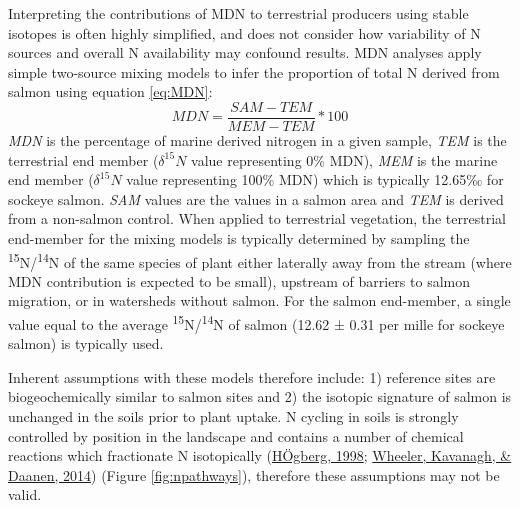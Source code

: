 \documentclass [11pt, proquest] {uwthesis}[2015/03/03]
\begin{document}
Interpreting the contributions of MDN to terrestrial producers using stable isotopes is often highly simplified, and does not consider how variability of N sources and overall N availability may confound results. MDN analyses apply simple two-source mixing models to infer the proportion of total N derived from salmon using equation \eqref{eq:MDN}:
\begin{equation} 
  MDN = \frac{SAM-TEM}{MEM-TEM}*100
  \label{eq:MDN}
\end{equation}
\emph{MDN} is the percentage of marine derived nitrogen in a given sample, \emph{TEM} is the terrestrial end member (\(\delta^{15}N\) value representing 0\% MDN), \emph{MEM} is the marine end member (\(\delta^{15}N\) value representing 100\% MDN) which is typically 12.65‰ for sockeye salmon. \emph{SAM} values are the values in a salmon area and \emph{TEM} is derived from a non-salmon control. When applied to terrestrial vegetation, the terrestrial end-member for the mixing models is typically determined by sampling the \textsuperscript{15}N/\textsuperscript{14}N of the same species of plant either laterally away from the stream (where MDN contribution is expected to be small), upstream of barriers to salmon migration, or in watersheds without salmon. For the salmon end-member, a single value equal to the average \textsuperscript{15}N/\textsuperscript{14}N of salmon (12.62 ± 0.31 per mille for sockeye salmon) is typically used.

Inherent assumptions with these models therefore include: 1) reference sites are biogeochemically similar to salmon sites and 2) the isotopic signature of salmon is unchanged in the soils prior to plant uptake. N cycling in soils is strongly controlled by position in the landscape and contains a number of chemical reactions which fractionate N isotopically (\protect\hyperlink{ref-Hogberg1998}{HÖgberg, 1998}; \protect\hyperlink{ref-Wheeler2014}{Wheeler, Kavanagh, \& Daanen, 2014}) (Figure \ref{fig:npathways}), therefore these assumptions may not be valid.
\end{document}
